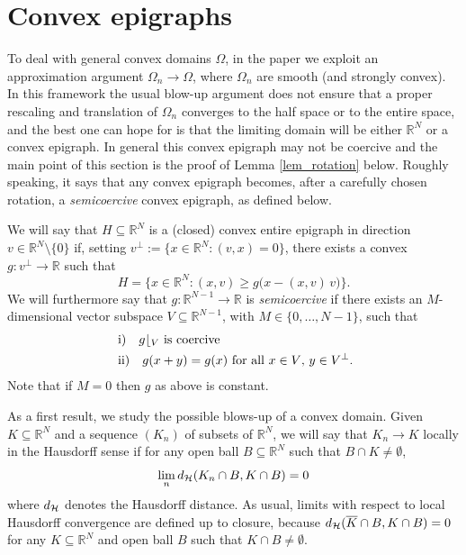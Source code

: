 \documentclass[12pt]{amsart}
\numberwithin{equation}{section}
\theoremstyle{plain}
\theoremstyle{plain}
\theoremstyle{plain}
\theoremstyle{definition}
\newcommand{\R}{{\mathbb R}}
\newcommand{\beq}{\begin{equation}}
\newcommand{\eeq}{\end{equation}}
\renewcommand{\ge}{\geqslant}
\newcommand{\cal}{\mathcal}
\begin{document}
 
\appendix



\section{Convex epigraphs}
\label{sec_lipschit_epi}

To deal with general convex domains $\Omega$, in the paper we exploit an approximation argument $\Omega_n \to \Omega$, where $\Omega_n$ are smooth (and strongly convex). 
In this framework the usual blow-up argument does not ensure that a proper rescaling and translation of $\Omega_n$ converges to the half space or to the entire space, and the best one can hope for is that the limiting domain will be either $\R^N$ or a convex epigraph. 
In general this convex epigraph may not be coercive and the main point of this section is the proof of Lemma \ref{lem_rotation} below. 
Roughly speaking, it says that any convex epigraph becomes, after a carefully chosen rotation, a {\em semicoercive} convex epigraph, as defined below.

We will say that $H\subseteq\R^N$ is a (closed) convex entire epigraph in direction $v\in \R^N\setminus\{0\}$ if, setting $v^{\perp}:=\{x \in \R^N : (v,x)=0\}$, there exists a convex $g: v^{\perp} \to \R$ such that 
\[
H=\big\{x\in \R^N: (x, v)\ge g\big(x-(x, v)\, v \big)\big\}.
\]
We will furthermore say that $g:\R^{N-1}\to \R$ is {\em semicoercive} if there exists an $M$-dimensional vector subspace $V\subseteq \R^{N-1}$, with $M \in \{0,\dots, N-1\}$, such that 
\beq
\label{semicoercivity}
\begin{split}
&\text{ i)\quad $ g\lfloor_V$ is coercive}\\
&\text{ ii)\quad $ g(x+y)=g(x)$ for all $x\in V$, $y\in V^\perp$.}
\end{split}
\eeq
Note that if $M=0$ then $g$ as above is constant.

As a first result, we study the possible blows-up of a convex domain. Given $K\subseteq\R^N$ and a sequence $(K_n)$ of subsets of $\R^N$, we will say that $K_n\to K$ locally in the Hausdorff sense if for any open ball $B\subseteq \R^N$ such that $B\cap K\neq \emptyset$, 
\[
\lim_{n} {\rm d}_{\cal H}(K_n \cap B, K\cap B)=0
\]
where ${\rm d}_{\cal H}$ denotes the Hausdorff distance. 
As usual, limits with respect to local Hausdorff convergence are defined up to closure, because ${\rm d}_{\cal H}(\overline{K} \cap B, K\cap B)=0$ for any $K\subseteq \R^N$ and open ball $B$ such that $K\cap B\neq \emptyset$.
\end{document}
